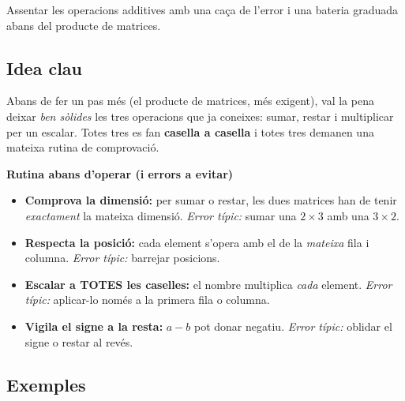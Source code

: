 %
{Assentar les operacions additives amb una caça de l'error i una bateria graduada abans del producte de matrices.}

\subsection{Idea clau}

Abans de fer un pas més (el producte de matrices, més exigent), val la pena
deixar \emph{ben sòlides} les tres operacions que ja coneixes: sumar, restar i
multiplicar per un escalar. Totes tres es fan \textbf{casella a casella} i
totes tres demanen una mateixa rutina de comprovació.

\begin{idea}
\textbf{Rutina abans d'operar (i errors a evitar)}
\begin{itemize}[leftmargin=1.4em, itemsep=2pt]
  \item \textbf{Comprova la dimensió:} per sumar o restar, les dues matrices han
        de tenir \emph{exactament} la mateixa dimensió. \emph{Error típic:} sumar
        una $2\times 3$ amb una $3\times 2$.
  \item \textbf{Respecta la posició:} cada element s'opera amb el de la
        \emph{mateixa} fila i columna. \emph{Error típic:} barrejar posicions.
  \item \textbf{Escalar a TOTES les caselles:} el nombre multiplica \emph{cada}
        element. \emph{Error típic:} aplicar-lo només a la primera fila o columna.
  \item \textbf{Vigila el signe a la resta:} $a-b$ pot donar negatiu.
        \emph{Error típic:} oblidar el signe o restar al revés.
\end{itemize}
\end{idea}

\subsection{Exemples}

